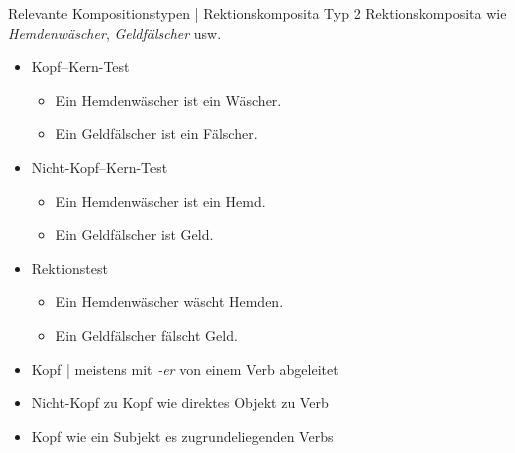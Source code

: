 \begin{frame}
  {Relevante Kompositionstypen | Rektionskomposita Typ 2}
  \onslide<+->
  Rektionskomposita wie \textit{Hemdenwäscher}, \textit{Geldfälscher} usw.
  \Halbzeile
  \begin{itemize}[<+->]
    \item Kopf--Kern-Test
      \begin{itemize}[<+->]
        \item Ein Hemdenwäscher ist ein Wäscher. \gruen{\Ck}
        \item Ein Geldfälscher ist ein Fälscher. \gruen{\Ck}
      \end{itemize}
    \item Nicht-Kopf--Kern-Test
      \begin{itemize}[<+->]
        \item Ein Hemdenwäscher ist ein Hemd. \rot{\Fl}
        \item Ein Geldfälscher ist Geld. \rot{\Fl}
      \end{itemize}
      \Halbzeile
    \item Rektionstest 
      \begin{itemize}[<+->]
        \item Ein Hemdenwäscher wäscht Hemden. \gruen{\Ck}
        \item Ein Geldfälscher fälscht Geld. \gruen{\Ck}
      \end{itemize}
      \Halbzeile
    \item Kopf | meistens mit \alert{\textit{-er}} von einem Verb abgeleitet
    \item Nicht-Kopf zu Kopf wie \alert{direktes Objekt} zu Verb
    \item Kopf wie ein \alert{Subjekt} es zugrundeliegenden Verbs
  \end{itemize}
\end{frame}

